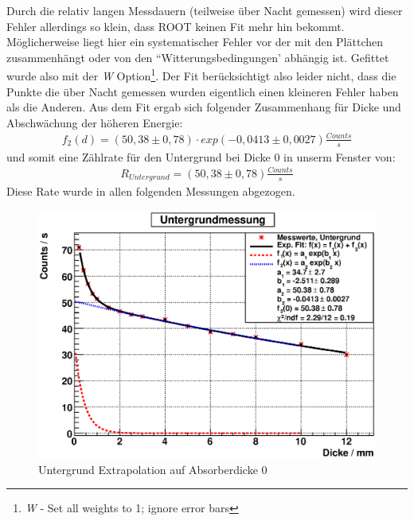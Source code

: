 \documentclass[12pt]{article}
\begin{document}
Durch die relativ langen Messdauern (teilweise über Nacht gemessen) wird dieser Fehler allerdings so klein, dass ROOT keinen Fit mehr hin bekommt.
Möglicherweise liegt hier ein systematischer Fehler vor der mit den Plättchen zusammenhängt oder von den ``Witterungsbedingungen' abhängig ist.
Gefittet wurde also mit der \textit{W} Option\footnote{\textit{W} - Set all weights to 1; ignore error bars}. Der Fit berücksichtigt also leider nicht, dass die Punkte die über Nacht gemessen wurden eigentlich einen kleineren Fehler haben als die Anderen. Aus dem Fit ergab sich folgender Zusammenhang für Dicke und Abschwächung der höheren Energie:
\begin{align*}
 f_2 (d) = (50,38 \pm 0,78) \cdot exp (-0,0413 \pm 0,0027) \frac{Counts}{s}
\end{align*}
 und somit eine Zählrate für den Untergrund bei Dicke 0 in unserm Fenster von:
\begin{align*}
 R_{Untergrund} = (50,38 \pm 0,78) \frac{Counts}{s} 
\end{align*}
Diese Rate wurde in allen folgenden Messungen abgezogen.
       

\begin{figure}[H]
 \includegraphics[width=0.9\linewidth]{pictures/untergrund.eps}
 \caption{Untergrund Extrapolation auf Absorberdicke 0}
\end{figure}
\end{document}
